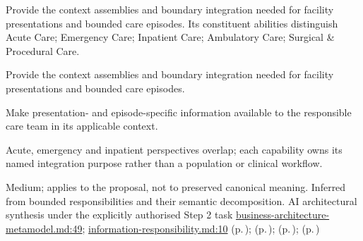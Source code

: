 Provide the context assemblies and boundary integration needed for facility presentations and bounded care episodes. Its constituent abilities distinguish Acute Care; Emergency Care; Inpatient Care; Ambulatory Care; Surgical \& Procedural Care.



Provide the context assemblies and boundary integration needed for facility presentations and bounded care episodes.



Make presentation- and episode-specific information available to the responsible care team in its applicable context.



Acute, emergency and inpatient perspectives overlap; each capability owns its named integration purpose rather than a population or clinical workflow.


Medium; applies to the proposal, not to preserved canonical meaning.
Inferred from bounded responsibilities and their semantic decomposition. AI architectural synthesis under the explicitly authorised Step 2 task \hyperref[evidence:4bac85accd34ce0b]{business-architecture-metamodel.md:49}; \hyperref[evidence:be61392fefb4bb10]{information-responsibility.md:10}
 (p.\,\pageref{cap:bec-episode-encounter-administration});  (p.\,\pageref{cap:bec-emergency-department-operations});  (p.\,\pageref{cap:bec-ward-operations});  (p.\,\pageref{cap:bec-reviewed-clinical-service-dependency-management})
